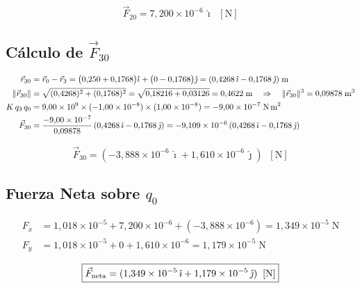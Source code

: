 \documentclass[12pt,letterpaper]{article}
\begin{document}
\begin{equation*}
    \boxed{\vec{F}_{20} = 7{,}200\times10^{-6}\,\hat{\imath}\;\;[\text{N}]}
\end{equation*}

\subsection*{C\'alculo de $\vec{F}_{30}$}

\begin{align*}
    \vec{r}_{30} &= \vec{r}_0 - \vec{r}_3
    = \bigl(0{,}250+0{,}1768\bigr)\hat{\imath}+\bigl(0-0{,}1768\bigr)\hat{\jmath}
    = (0{,}4268\,\hat{\imath}-0{,}1768\,\hat{\jmath})\;\text{m}\\
    \|\vec{r}_{30}\| &= \sqrt{(0{,}4268)^2+(0{,}1768)^2}
    = \sqrt{0{,}18216+0{,}03126} = 0{,}4622\;\text{m}
    \quad\Rightarrow\quad
    \|\vec{r}_{30}\|^3 = 0{,}09878\;\text{m}^3\\
    K\,q_3\,q_0 &= 9{,}00\times10^9\times(-1{,}00\times10^{-8})\times(1{,}00\times10^{-8})
                 = -9{,}00\times10^{-7}\;\text{N\,m}^2\\
    \vec{F}_{30} &= \frac{-9{,}00\times10^{-7}}{0{,}09878}
                   \,(0{,}4268\,\hat{\imath}-0{,}1768\,\hat{\jmath})
    = -9{,}109\times10^{-6}\,(0{,}4268\,\hat{\imath}-0{,}1768\,\hat{\jmath})
\end{align*}

\begin{equation*}
    \boxed{\vec{F}_{30} = (-3{,}888\times10^{-6}\,\hat{\imath}+1{,}610\times10^{-6}\,\hat{\jmath})\;\;[\text{N}]}
\end{equation*}

\subsection*{Fuerza Neta sobre $q_0$}

\begin{align*}
    F_x &= 1{,}018\times10^{-5}+7{,}200\times10^{-6}+(-3{,}888\times10^{-6}) = 1{,}349\times10^{-5}\;\text{N}\\
    F_y &= 1{,}018\times10^{-5}+0+1{,}610\times10^{-6} = 1{,}179\times10^{-5}\;\text{N}
\end{align*}

\begin{equation*}
    \boxed{\vec{F}_{\rm neta} = (1{,}349\times10^{-5}\,\hat{\imath}+1{,}179\times10^{-5}\,\hat{\jmath})\;\;[\text{N}]}
\end{equation*}
\end{document}
